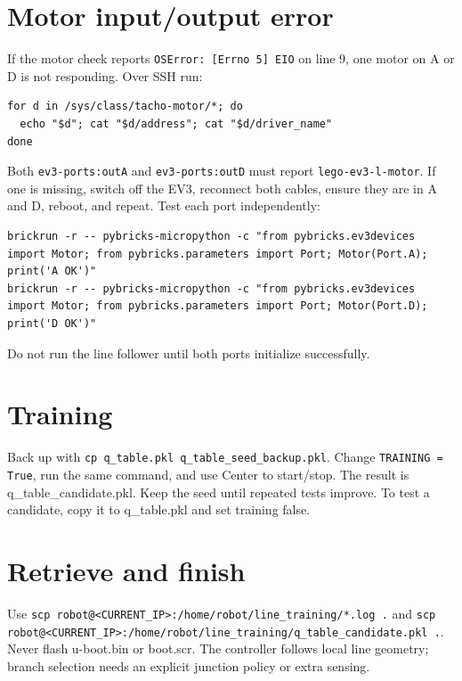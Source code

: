\documentclass{article}
\begin{document}
\section*{Motor input/output error}
If the motor check reports \texttt{OSError: [Errno 5] EIO} on line 9, one motor on A or D is not responding. Over SSH run:
\begin{verbatim}
for d in /sys/class/tacho-motor/*; do
  echo "$d"; cat "$d/address"; cat "$d/driver_name"
done
\end{verbatim}
Both \texttt{ev3-ports:outA} and \texttt{ev3-ports:outD} must report \texttt{lego-ev3-l-motor}. If one is missing, switch off the EV3, reconnect both cables, ensure they are in A and D, reboot, and repeat. Test each port independently:
\begin{verbatim}
brickrun -r -- pybricks-micropython -c "from pybricks.ev3devices import Motor; from pybricks.parameters import Port; Motor(Port.A); print('A OK')"
brickrun -r -- pybricks-micropython -c "from pybricks.ev3devices import Motor; from pybricks.parameters import Port; Motor(Port.D); print('D OK')"
\end{verbatim}
Do not run the line follower until both ports initialize successfully.
\section*{Training}
Back up with \texttt{cp q\_table.pkl q\_table\_seed\_backup.pkl}. Change \texttt{TRAINING = True}, run the same command, and use Center to start/stop. The result is q\_table\_candidate.pkl. Keep the seed until repeated tests improve. To test a candidate, copy it to q\_table.pkl and set training false.
\section*{Retrieve and finish}
Use \texttt{scp robot@<CURRENT\_IP>:/home/robot/line\_training/*.log .} and \texttt{scp robot@<CURRENT\_IP>:/home/robot/line\_training/q\_table\_candidate.pkl .}. Never flash u-boot.bin or boot.scr. The controller follows local line geometry; branch selection needs an explicit junction policy or extra sensing.
\end{document}
